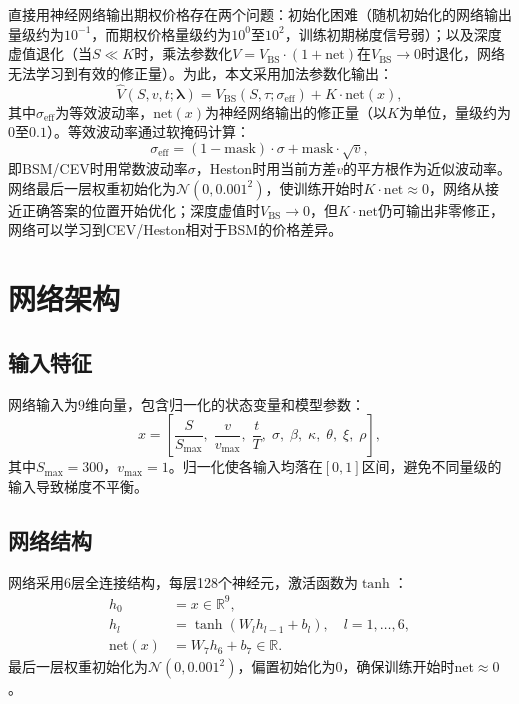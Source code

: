 直接用神经网络输出期权价格存在两个问题：初始化困难（随机初始化的网络输出量级约为$10^{-1}$，而期权价格量级约为$10^0$至$10^2$，训练初期梯度信号弱）；以及深度虚值退化（当$S\ll K$时，乘法参数化$V=V_\text{BS}\cdot(1+\text{net})$在$V_\text{BS}\to 0$时退化，网络无法学习到有效的修正量）。为此，本文采用加法参数化输出：
\begin{equation}\label{eq:additive}
  \hat{V}(S,v,t;\boldsymbol{\lambda}) = V_\text{BS}(S,\tau;\sigma_\text{eff}) + K\cdot\text{net}(x),
\end{equation}
其中$\sigma_\text{eff}$为等效波动率，$\text{net}(x)$为神经网络输出的修正量（以$K$为单位，量级约为$0$至$0.1$）。等效波动率通过软掩码计算：
\begin{equation}\label{eq:sigma_eff}
  \sigma_\text{eff} = (1-\text{mask})\cdot\sigma + \text{mask}\cdot\sqrt{v},
\end{equation}
即BSM/CEV时用常数波动率$\sigma$，Heston时用当前方差$v$的平方根作为近似波动率。网络最后一层权重初始化为$\mathcal{N}(0, 0.001^2)$，使训练开始时$K\cdot\text{net}\approx 0$，网络从接近正确答案的位置开始优化；深度虚值时$V_\text{BS}\to 0$，但$K\cdot\text{net}$仍可输出非零修正，网络可以学习到CEV/Heston相对于BSM的价格差异。

\section{网络架构}\label{sec:architecture}

\subsection{输入特征}

网络输入为9维向量，包含归一化的状态变量和模型参数：
\begin{equation}
  x = \left[\frac{S}{S_\text{max}},\; \frac{v}{v_\text{max}},\; \frac{t}{T},\; \sigma,\; \beta,\; \kappa,\; \theta,\; \xi,\; \rho\right],
\end{equation}
其中$S_\text{max}=300$，$v_\text{max}=1$。归一化使各输入均落在$[0,1]$区间，避免不同量级的输入导致梯度不平衡。

\subsection{网络结构}

网络采用6层全连接结构，每层128个神经元，激活函数为$\tanh$：
\begin{align}
  h_0 &= x \in \mathbb{R}^9, \\
  h_l &= \tanh(W_l h_{l-1} + b_l), \quad l=1,\ldots,6, \\
  \text{net}(x) &= W_7 h_6 + b_7 \in \mathbb{R}.
\end{align}
最后一层权重初始化为$\mathcal{N}(0, 0.001^2)$，偏置初始化为0，确保训练开始时$\text{net}\approx 0$。

